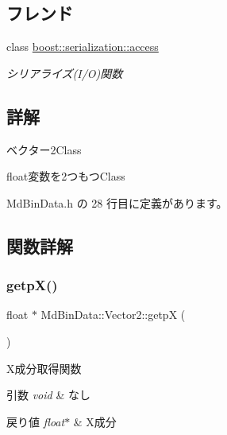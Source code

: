 \subsection*{フレンド}
\begin{DoxyCompactItemize}
\item 
class \mbox{\hyperlink{class_md_bin_data_1_1_vector2_ac98d07dd8f7b70e16ccb9a01abf56b9c}{boost\+::serialization\+::access}}
\begin{DoxyCompactList}\small\item\em シリアライズ(I/O)関数 \end{DoxyCompactList}\end{DoxyCompactItemize}


\subsection{詳解}
ベクター2\+Class 

float変数を2つもつ\+Class 

 Md\+Bin\+Data.\+h の 28 行目に定義があります。



\subsection{関数詳解}
\mbox{\label{class_md_bin_data_1_1_vector2_a6d45ff9158c5056f0b9555ee4cb68924}} 
\subsubsection{\texorpdfstring{getp\+X()}{getpX()}}
{\footnotesize\ttfamily float $\ast$ Md\+Bin\+Data\+::\+Vector2\+::getpX (\begin{DoxyParamCaption}{ }\end{DoxyParamCaption})}



X成分取得関数 


\begin{DoxyParams}{引数}
{\em void} & なし \\
\hline
\end{DoxyParams}

\begin{DoxyRetVals}{戻り値}
{\em float$\ast$} & X成分 \\
\hline
\end{DoxyRetVals}


